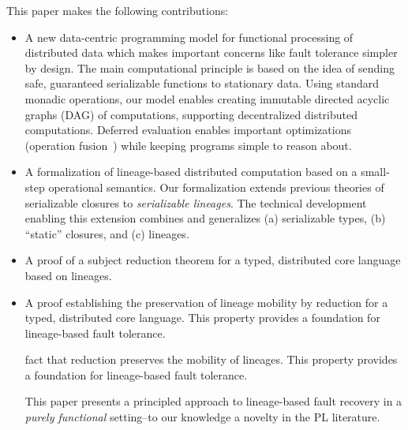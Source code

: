 \documentclass{article}
\begin{document}
This paper makes the following contributions:
\begin{itemize}
  \item A new data-centric programming model for functional processing of distributed data which makes important concerns like fault tolerance simpler by design. The main computational principle is based on the idea of sending safe, guaranteed serializable functions to stationary data. Using standard monadic operations, our model enables creating immutable directed acyclic graphs (DAG) of computations, supporting decentralized distributed computations. Deferred evaluation enables important optimizations (operation fusion~\cite{FlumeJava}) while keeping programs simple to reason about.

  \item A formalization of lineage-based distributed computation based on a small-step operational semantics. Our formalization extends previous theories of serializable closures to {\em serializable lineages}. The technical development enabling this extension combines and generalizes (a) serializable types, (b) ``static'' closures, and (c) lineages.

  \item A proof of a subject reduction theorem for a typed, distributed core language based on lineages.

  \item A proof establishing the preservation of lineage mobility by reduction for a typed, distributed core language. This property provides a foundation for lineage-based fault tolerance.
  
  fact that reduction preserves the mobility of lineages. This property provides a foundation for lineage-based fault tolerance.



This paper presents a principled approach to
lineage-based fault recovery in a {\em purely functional} setting--to our
knowledge a novelty in the PL literature.
\end{itemize}
\end{document}
